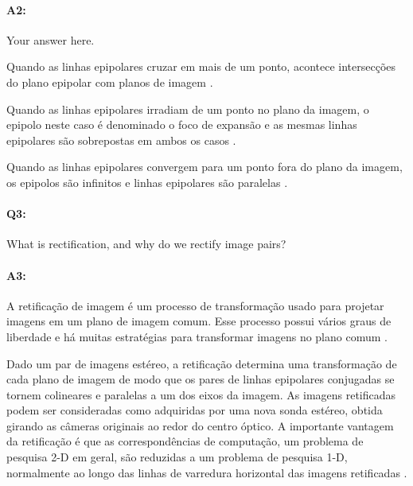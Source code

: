 \paragraph{A2:} Your answer here.

Quando as linhas epipolares cruzar em mais de um ponto, acontece intersecções do plano epipolar com planos de imagem \cite{hartley2003multiple}.

Quando as linhas epipolares irradiam de um ponto no plano da imagem, o epipolo neste caso é denominado o foco de expansão e as mesmas linhas epipolares são sobrepostas em ambos os casos \cite{hartley2003multiple}.

Quando as linhas epipolares convergem para um ponto fora do plano da imagem, os epipolos são infinitos e linhas epipolares são paralelas \cite{hartley2003multiple}.



\pagebreak
\paragraph{Q3:} What is rectification, and why do we rectify image pairs?

\paragraph{A3:} A retificação de imagem é um processo de transformação usado para projetar imagens em um plano de imagem comum. Esse processo possui vários graus de liberdade e há muitas estratégias para transformar imagens no plano comum \cite{wiki}.

Dado um par de imagens estéreo, a retificação determina uma transformação de cada plano de imagem de modo que os pares de linhas epipolares conjugadas se tornem colineares e paralelas a um dos eixos da imagem. As imagens retificadas podem ser consideradas como adquiridas por uma nova sonda estéreo, obtida girando as câmeras originais ao redor do centro óptico. A importante vantagem da retificação é que as correspondências de computação, um problema de pesquisa 2-D em geral, são reduzidas a um problema de pesquisa 1-D, normalmente ao longo das linhas de varredura horizontal das imagens retificadas \cite{reti}.











